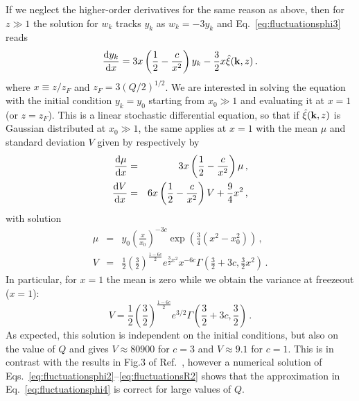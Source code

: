 If we neglect the higher-order derivatives for the same reason as above, then for $z \gg 1$ the solution for $w_k$ tracks $y_k$ as $w_k  = -3y_k$ and Eq.~\eqref{eq:fluctuationsphi3} reads
\begin{equation}
	\label{eq:fluctuationsphi4}
	\frac{{\rm d}y_k}{{\rm d}x} = 3x\left(\frac{1}{2}- \frac{c}{x^2}\right) y_k - \frac{3}{2}x \hat\xi({\bf k}, z)\,.
\end{equation}
where $x \equiv z/z_F$ and $z_F = 3(Q/2)^{1/2}$. We are interested in solving the equation with the initial condition $y_k = y_0$ starting from $x_0 \gg 1$ and evaluating it at $x = 1$ (or $z = z_F$). This is a linear stochastic differential equation, so that if $\hat\xi({\bf k}, z)$ is Gaussian distributed at $x_0 \gg 1$, the same applies at $x = 1$ with the mean $\mu$ and standard deviation $V$ given by respectively by
\begin{eqnarray}
	\frac{{\rm d}\mu}{{\rm d}x} &=& 3x\left(\frac{1}{2}- \frac{c}{x^2}\right)\mu\,,\\
	\frac{{\rm d}V}{{\rm d}x} &=& 6x\left(\frac{1}{2}- \frac{c}{x^2}\right)V + \frac{9}{4}x^2\,,
\end{eqnarray}
with solution
\begin{eqnarray}
	\mu &=& y_0 \left(\frac{x}{x_0}\right)^{-3 c} \exp\left(\frac{3}{4}(x^2 - x_0^2)\right)\,,\\
	V &=& \frac{1}{2}\left(\frac{3}{2}\right)^{\frac{1 - 6 c}{2}} e^{\frac{3}{2} x^2} x^{-6 c}\Gamma\left(\frac{3}{2} + 3 c, \frac{3}{2} x^2\right)\,.
\end{eqnarray}
In particular, for $x = 1$ the mean is zero while we obtain the variance at freezeout ($x = 1$):
\begin{equation}
	V = \frac{1}{2}\left(\frac{3}{2}\right)^{\frac{1 - 6 c}{2}} e^{3/2}\Gamma\left(\frac{3}{2} + 3 c, \frac{3}{2}\right)\,.
\end{equation}
As expected, this solution is independent on the initial conditions, but also on the value of $Q$ and gives $V \approx 80900$ for $c = 3$ and $V\approx 9.1$ for $c = 1$. This is in contrast with the results in Fig.3 of Ref.~\cite{Bastero-Gil:2011rva}, however a numerical solution of Eqs.~\eqref{eq:fluctuationsphi2}--\eqref{eq:fluctuationsR2} shows that the approximation in Eq.~\eqref{eq:fluctuationsphi4} is correct for large values of $Q$.

